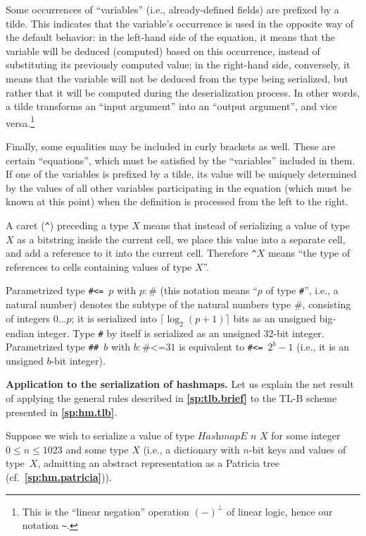 \documentclass[12pt,oneside]{article}
\def\makepoint#1{\medbreak\noindent{\bf #1.\ }}
\def\nxsubpoint{\refstepcounter{subsubsection}%
  \smallbreak\makepoint{\thesubsubsection}}
\def\refpoint#1{{\rm\textbf{\ref{#1}}}}
\let\ptref=\refpoint
\def\emb#1{\textbf{#1.}}
\let\tp=\textit
\def\HashmapE{\tp{HashmapE}}
\def\caret{\^{}}
\begin{document}
Some occurrences of ``variables'' (i.e., already-defined fields) are prefixed by a tilde. This indicates that the variable's occurrence is used in the opposite way of the default behavior: in the left-hand side of the equation, it means that the variable will be deduced (computed) based on this occurrence, instead of substituting its previously computed value; in the right-hand side, conversely, it means that the variable will not be deduced from the type being serialized, but rather that it will be computed during the deserialization process. In other words, a tilde transforms an ``input argument'' into an ``output argument'', and vice versa.\footnote{This is the ``linear negation'' operation $(-)^\perp$ of linear logic, hence our notation \texttt{\~}.}

Finally, some equalities may be included in curly brackets as well. These are certain ``equations'', which must be satisfied by the ``variables'' included in them. If one of the variables is prefixed by a tilde, its value will be uniquely determined by the values of all other variables participating in the equation (which must be known at this point) when the definition is processed from the left to the right.

A caret (\texttt{\caret}) preceding a type $X$ means that instead of serializing a value of type $X$ as a bitstring inside the current cell, we place this value into a separate cell, and add a reference to it into the current cell. Therefore \texttt{\caret$X$} means ``the type of references to cells containing values of type $X$''.

Parametrized type \texttt{\#<= $p$} with $p:\texttt{\#}$ (this notation means ``$p$ of type \texttt{\#}'', i.e., a natural number) denotes the subtype of the natural numbers type $\#$, consisting of integers $0\ldots p$; it is serialized into $\lceil\log_2(p+1)\rceil$ bits as an unsigned big-endian integer. Type \texttt{\#} by itself is serialized as an unsigned 32-bit integer. Parametrized type \texttt{\#\# $b$} with $b:\texttt{\#<=}31$ is equivalent to \texttt{\#<= $2^b-1$} (i.e., it is an unsigned $b$-bit integer).

\nxsubpoint\emb{Application to the serialization of hashmaps} Let us explain the net result of applying the general rules described in \ptref{sp:tlb.brief} to the TL-B scheme presented in \ptref{sp:hm.tlb}.

Suppose we wish to serialize a value of type $\HashmapE$ $n$ $X$ for some integer $0\leq n\leq 1023$ and some type $X$ (i.e., a dictionary with $n$-bit keys and values of type~$X$, admitting an abstract representation as a Patricia tree (cf.~\ptref{sp:hm.patricia})).
\end{document}
